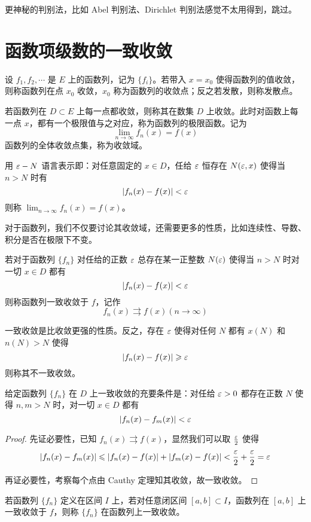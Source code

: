更神秘的判别法，比如 Abel 判别法、Dirichlet 判别法感觉不太用得到，跳过。


\section{函数项级数的一致收敛}

设 $f_1, f_2, \cdots$ 是 $E$ 上的函数列，记为 $\{f_i\}$。若带入 $x = x_0$ 使得函数列的值收敛，则称函数列在点 $x_0$ 收敛，$x_0$ 称为函数列的收敛点；反之若发散，则称发散点。

若函数列在 $D \subset E$ 上每一点都收敛，则称其在数集 $D$ 上收敛。此时对函数上每一点 $x$，都有一个极限值与之对应，称为函数列的极限函数。记为
\[ \lim_{n \to \infty} f_n(x) = f(x) \]
函数列的全体收敛点集，称为收敛域。

用 $\varepsilon - N$ 语言表示即：对任意固定的 $x \in D$，任给 $\varepsilon$ 恒存在 $N(\varepsilon, x)$ 使得当 $n > N$ 时有
\[ | f_n(x) - f(x) | < \varepsilon \]
则称 $\lim_{n \to \infty} f_n(x) = f(x)$。

对于函数列，我们不仅要讨论其收敛域，还需要更多的性质，比如连续性、导数、积分是否在极限下不变。

\begin{definition}
	若对于函数列 $\{f_n\}$ 对任给的正数 $\varepsilon$ 总存在某一正整数 $N(\varepsilon)$ 使得当 $n > N$ 时对一切 $x \in D$ 都有
	\[ |f_n(x) - f(x)| < \varepsilon \]
	则称函数列一致收敛于 $f$，记作
	\[ f_n(x) \rightrightarrows f(x) (n \to \infty) \]
\end{definition}

一致收敛是比收敛更强的性质。反之，存在 $\varepsilon$ 使得对任何 $N$ 都有 $x(N)$ 和 $n(N) > N$ 使得
\[ |f_n(x) - f(x) | \geqslant \varepsilon \]
则称其不一致收敛。

\begin{theorem}
	给定函数列 $\{f_n\}$ 在 $D$ 上一致收敛的充要条件是：对任给 $\varepsilon > 0$ 都存在正数 $N$ 使得 $n, m > N$ 时，对一切 $x \in D$ 都有
	\[ |f_n(x) - f_m(x) | < \varepsilon \]
\end{theorem}

\begin{proof}
	先证必要性，已知 $f_n(x) \rightrightarrows f(x)$，显然我们可以取 $\frac{\varepsilon}{2}$ 使得
	\[ |f_n(x) - f_m(x)| \leqslant |f_n(x) - f(x)| + |f_m(x) - f(x)| < \frac{\varepsilon}{2} + \frac{\varepsilon}{2} = \varepsilon \]
	
	再证必要性，考察每个点由 Cauthy 定理知其收敛，故一致收敛。
\end{proof}


\begin{definition}
	若函数列 $\{f_n\}$ 定义在区间 $I$ 上，若对任意闭区间 $[a, b] \subset I$，函数列在 $[a, b]$ 上一致收敛于 $f$，则称 $\{f_n\}$ 在函数列上一致收敛。
\end{definition}


